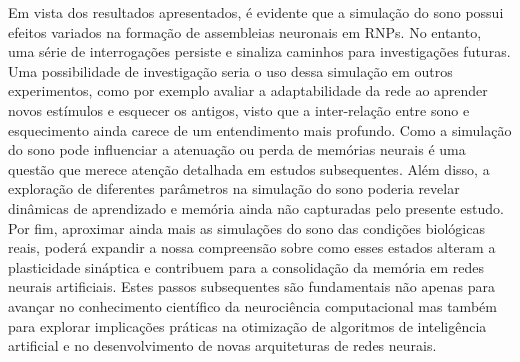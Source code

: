 Em vista dos resultados apresentados, é evidente que a simulação do sono possui efeitos variados na formação de assembleias
neuronais em RNPs. No entanto, uma série de interrogações persiste e sinaliza caminhos para investigações futuras. Uma
possibilidade de investigação seria o uso dessa simulação em outros experimentos, como por exemplo avaliar a adaptabilidade da
rede ao aprender novos estímulos e esquecer os antigos, visto que a inter-relação entre sono e esquecimento ainda carece de um
entendimento mais profundo. Como a simulação do sono pode influenciar a atenuação ou perda de memórias neurais é uma questão que
merece atenção detalhada em estudos subsequentes. Além disso, a exploração de diferentes parâmetros na simulação do sono poderia
revelar dinâmicas de aprendizado e memória ainda não capturadas pelo presente estudo. Por fim, aproximar ainda mais as simulações
do sono das condições biológicas reais, poderá expandir a nossa compreensão sobre como esses estados alteram a plasticidade
sináptica e contribuem para a consolidação da memória em redes neurais artificiais. Estes passos subsequentes são fundamentais não
apenas para avançar no conhecimento científico da neurociência computacional mas também para explorar implicações práticas na
otimização de algoritmos de inteligência artificial e no desenvolvimento de novas arquiteturas de redes neurais.
